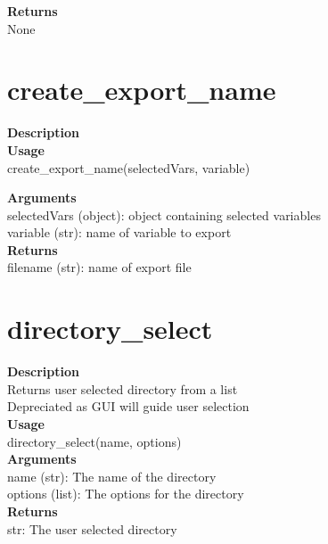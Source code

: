 \documentclass[11pt, oneside]{article}
\begin{document}
\noindent\textbf{Returns} \\
        None\\


\section{create\_export\_name}

\textbf{Description} \\

\noindent\textbf{Usage} \\
        create\_export\_name(selectedVars, variable)

\noindent\textbf{Arguments} \\
        selectedVars (object): object containing selected variables\\
        variable (str): name of variable to export\\

\noindent\textbf{Returns} \\
        filename (str): name of export file\\


\section{directory\_select}

\textbf{Description} \\
        Returns user selected directory from a list\\
        Depreciated as GUI will guide user selection\\

\noindent\textbf{Usage} \\
        directory\_select(name, options) \\

\noindent\textbf{Arguments} \\
        name (str): The name of the directory\\
        options (list): The options for the directory\\

\noindent\textbf{Returns} \\
        str: The user selected directory\\
\end{document}
